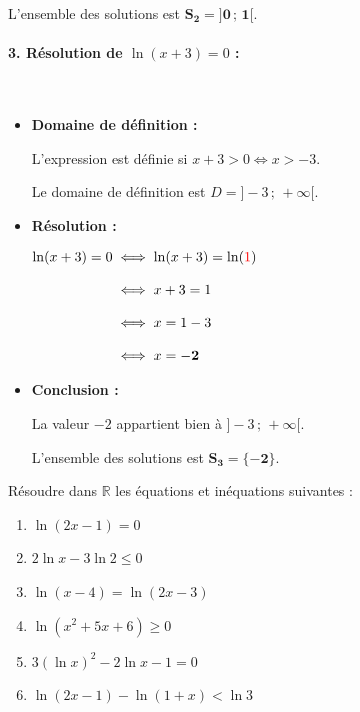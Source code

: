 \documentclass[12pt,a4paper]{article}
\begin{document}
\begin{tcolorbox}[colback=gray!5!white,colframe=myblue,title=\textbf{Correction détaillée}]
\begin{itemize}
    L'ensemble des solutions est $\mathbf{S_2 = ]0 \,;\, 1[}$.
\end{itemize}

\vspace{0.4cm}

\paragraph{3. Résolution de $\ln(x + 3) = 0$ :}\leavevmode\\[2mm]
\begin{itemize}
    \item \textbf{Domaine de définition :} 
    
    L'expression est définie si $x + 3 > 0 \iff x > -3$. 
    
    Le domaine de définition est $D = ]-3 \,;\, +\infty[$.
    
    \item \textbf{Résolution :}
    
    $
    \begin{aligned}
    \ln(x + 3) = 0 &\iff \ln(x + 3) = \ln({\color{red}1})\\[3mm]
                   &\iff x + 3 = 1\\[3mm]
                   &\iff x = 1 - 3\\[3mm]
                   &\iff x = \mathbf{-2}
    \end{aligned}
    $
    \item \textbf{Conclusion :} 
    
    La valeur $-2$ appartient bien à $]-3 \,;\, +\infty[$. 
    
    L'ensemble des solutions est $\mathbf{S_3 = \{-2\}}$.
\end{itemize}

\end{tcolorbox}

\begin{tcolorbox}[colback=yellow!5!white,colframe=myred,title=\textbf{Devoir à la maison : Équations et inéquations logarithmiques}]
Résoudre dans $\mathbb{R}$ les équations et inéquations suivantes :
\begin{enumerate}
    \item $\ln(2x - 1) = 0$
    \item $2\ln x - 3\ln 2 \le 0$
    \item $\ln(x - 4) = \ln(2x - 3)$
    \item $\ln(x^2 + 5x + 6) \ge 0$
    \item $3(\ln x)^2 - 2\ln x - 1 = 0$
    \item $\ln(2x - 1) - \ln(1 + x) < \ln 3$
\end{enumerate}
\end{tcolorbox}
\end{document}
